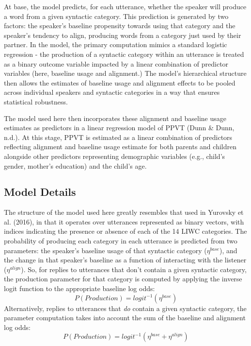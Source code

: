 \documentclass[10pt, letterpaper]{article}
\begin{document}
At base, the model predicts, for each utterance, whether the speaker
will produce a word from a given syntactic category. This prediction is
generated by two factors: the speaker's baseline propensity towards
using that category and the speaker's tendency to align, producing words
from a category just used by their partner. In the model, the primary
computation mimics a standard logistic regression - the production of a
syntactic category within an utterance is treated as a binary outcome
variable impacted by a linear combination of predictor variables (here,
baseline usage and alignment.) The model's hierarchical structure then
allows the estimates of baseline usage and alignment effects to be
pooled across individual speakers and syntactic categories in a way that
ensures statistical robustness.

The model used here then incorporates these alignment and baseline usage
estimates as predictors in a linear regression model of PPVT (Dunn \&
Dunn, n.d.). At this stage, PPVT is estimated as a linear combination of
predictors reflecting alignment and baseline usage estimate for both
parents and children alongside other predictors representing demographic
variables (e.g., child's gender, mother's education) and the child's
age.

\hypertarget{model-details}{%
\subsection{Model Details}\label{model-details}}

The structure of the model used here greatly resembles that used in
Yurovsky et al. (2016), in that it operates over utterances represented
as binary vectors, with indices indicating the presence or absence of
each of the 14 LIWC categories. The probability of producing each
category in each utterance is predicted from two parameters: the
speaker's baseline usage of that syntactic category (\(\eta^{base}\)),
and the change in that speaker's baseline as a function of interacting
with the listener (\(\eta^{align}\)). So, for replies to utterances that
don't contain a given syntactic category, the production parameter for
that category is computed by applying the inverse logit function to the
appropriate baseline log odds: \[
P(Production) = logit^{-1}(\eta^{base})
\] Alternatively, replies to utterances that \emph{do} contain a given
syntactic category, the parameter computation takes into account the sum
of the baseline and alignment log odds: \[
P(Production) = logit^{-1}(\eta^{base}+\eta^{align})
\]
\end{document}
